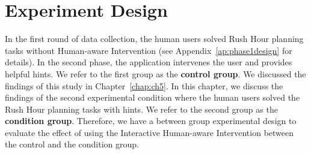 \section{Experiment Design}
In the first round of data collection, the human users solved Rush Hour planning tasks without Human-aware Intervention (see Appendix~\ref{ap:phase1design} for details).
In the second phase, the application intervenes the user and provides helpful hints.
We refer to the first group as the \textbf{control group}.
We discussed the findings of this study in Chapter~\ref{chap:ch5}.
In this chapter, we discuss the findings of the second experimental condition where the human users solved the Rush Hour planning tasks with hints.
We refer to the second group as the \textbf{condition group}.
Therefore, we have a between group experimental design to evaluate the effect of using the Interactive Human-aware Intervention between the control and the condition group.

